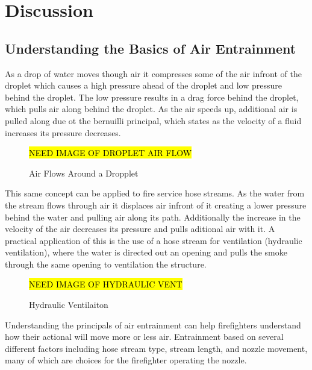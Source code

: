 \documentclass[12pt,oneside]{book}
\begin{document}





\clearpage

\chapter{Discussion}

\section{Understanding the Basics of Air Entrainment}
As a drop of water moves though air it compresses some of the air infront of the droplet which causes a high pressure ahead of the droplet and low pressure behind the droplet. The low pressure results in a drag force behind the droplet, which pulls air along behind the droplet. As the air speeds up, additional air is pulled along due ot the bernuilli principal, which states as the velocity of a fluid increases its pressure decreases. 

\begin{figure}[!ht]
\hl{NEED IMAGE OF DROPLET AIR FLOW}
\caption{Air Flows Around a Dropplet}
\label{fig:droplet_flow}
\end{figure}

This same concept can be applied to fire service hose streams. As the water from the stream flows through air it displaces air infront of it creating a lower pressure behind the water and pulling air along its path. Additionally the increase in the velocity of the air decreases its pressure and pulls aditional air with it. A practical application of this is the use of a hose stream for ventilation (hydraulic ventilation), where the water is directed out an opening and pulls the smoke through the same opening to ventilation the structure.

\begin{figure}[!ht]
\hl{NEED IMAGE OF HYDRAULIC VENT}
\caption{Hydraulic Ventilaiton}
\label{fig:Hydraulic_Vent}
\end{figure}
 
Understanding the principals of air entrainment can help firefighters understand how their actional will move more or less air. Entrainment based on several different factors including hose stream type, stream length, and nozzle movement, many of which are choices for the firefighter operating the nozzle.
\end{document}

